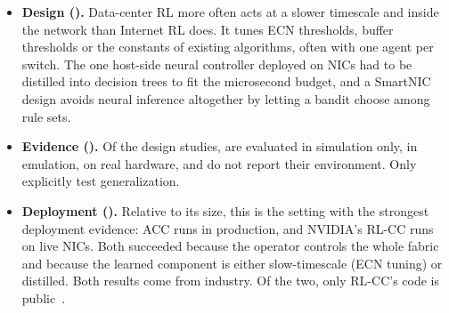 \begin{itemize}
  \item \textbf{Design ().} Data-center RL more often acts at a slower timescale and inside the network than Internet RL does. It tunes ECN thresholds, buffer thresholds or the constants of existing algorithms, often with one agent per switch. The one host-side neural controller deployed on NICs had to be distilled into decision trees to fit the microsecond budget, and a SmartNIC design avoids neural inference altogether by letting a bandit choose among rule sets.
  \item \textbf{Evidence ().} Of the \nChDatacenterDesign{} design studies, \nChDatacenterSim{} are evaluated in simulation only, \nChDatacenterEmu{} in emulation, \nChDatacenterReal{} on real hardware, and \nChDatacenterNR{} do not report their environment. Only \nChDatacenterGen{} explicitly test generalization.
  \item \textbf{Deployment ().} Relative to its size, this is the setting with the strongest deployment evidence: ACC runs in production, and NVIDIA's RL-CC runs on live NICs. Both succeeded because the operator controls the whole fabric and because the learned component is either slow-timescale (ECN tuning) or distilled. Both results come from industry. Of the two, only RL-CC's code is public~\cite{fuhrer2023nvidia}.
\end{itemize}
